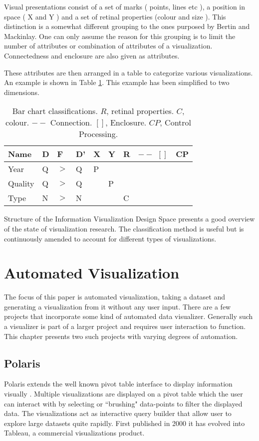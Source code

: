 \documentclass[a4paper, 11pt, titlepage, onehalfspacing]{report}
\begin{document}
Visual presentations consist of a set of marks ( points, lines etc ), a position in space ( X and Y ) and a set of retinal properties (colour and size ). This distinction is a somewhat different grouping to the ones purposed by Bertin and Mackinlay. One can only assume the reason for this grouping is to limit the number of attributes or combination of attributes of a visualization. Connectedness and enclosure are also given as attributes. 

These attributes are then arranged in a table to categorize various visualizations. An example is shown in Table \ref{struct_table}. This example has been simplified to two dimensions.

\begin{table}[!ht]
\centering
    \begin{tabular}{|llll|llll|l|}
    \hline
    Name    & D & F & D' & X & Y & R & $--$ $[ ]$ & CP \\ \hline
    Year    & Q & $>$ & Q  & P & ~ & ~ & ~    & ~  \\
    Quality & Q & $>$ & Q  & ~ & P & ~ & ~    & ~  \\
    Type    & N & $>$ & N  & ~ & ~ & C & ~    & ~  \\ \hline
    \end{tabular}
\caption{Bar chart classifications. $R$, retinal properties. $C$, colour. $--$ Connection. $[ ]$, Enclosure. $CP$, Control Processing.}
    \label{struct_table}
\end{table}

Structure of the Information Visualization Design Space presents a good overview of the state of visualization research. The classification method is useful but is continuously amended to account for different types of visualizations.



	\section{Automated Visualization}

The focus of this paper is automated visualization, taking a dataset and generating a visualization from it without any user input. There are a few projects that incorporate some kind of automated data visualizer. Generally such a visualizer is part of a larger project and requires user interaction to function. This chapter presents two such projects with varying degrees of automation.

		\subsection{Polaris}
Polaris extends the well known pivot table interface to display information visually \cite{stolte2002polaris}. Multiple visualizations are displayed on a pivot table which the user can interact with by selecting or ``brushing" data-points to filter the displayed data. The visualizations act as interactive query builder that allow user to explore large datasets quite rapidly. First published in 2000 it has evolved into Tableau, a commercial visualizations product.
\end{document}
